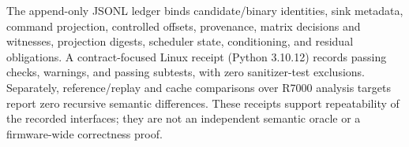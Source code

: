 The append-only JSONL ledger binds candidate/binary identities, sink metadata, command projection, controlled offsets, provenance, matrix decisions and witnesses, projection digests, scheduler state, conditioning, and residual obligations. A contract-focused Linux receipt (Python 3.10.12) records \TSDSReviewContractTests{} passing checks, \TSDSReviewContractWarnings{} warnings, and \TSDSReviewContractSubtests{} passing subtests, with zero sanitizer-test exclusions. Separately, reference/replay and cache comparisons over \TSDSReviewStrictTargets{} R7000 analysis targets report zero recursive semantic differences. These receipts support repeatability of the recorded interfaces; they are not an independent semantic oracle or a firmware-wide correctness proof.

